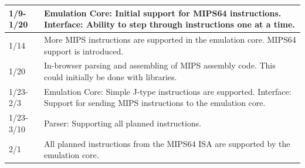 \documentclass[
    paper=letter,
    parskip=half,
    fontsize=12pt,
    titlepage=firstiscover,
    toc=bibliography,
    numbers=endperiod
]{scrartcl}
\begin{document}
{\begin{tabularx}{\textwidth}{|l|X|}
        1/9-1/20      & Emulation Core: Initial support for MIPS64 instructions. \newline Interface: Ability to step through instructions one at a time.                                                                                                                                                                                                                                                                                                     \\\hline
        1/14          & More MIPS instructions are supported in the emulation core. MIPS64 support is introduced.                                                                                                                                                                                                                                                                                                                                            \\\hline
        1/20          & In-browser parsing and assembling of MIPS assembly code. This could initially be done with libraries.                                                                                                                                                                                                                                                                                                                                \\\hline
        1/23-2/3      & Emulation Core: Simple J-type instructions are supported. \newline Interface: Support for sending MIPS instructions to the emulation core.                                                                                                                                                                                                                                                                                           \\\hline
        1/23-3/10     & Parser: Supporting all planned instructions.                                                                                                                                                                                                                                                                                                                                                                                         \\\hline
        2/1           & All planned instructions from the MIPS64 ISA are supported by the emulation core.                                                                                                                                                                                                                                                                                                                                                    \\\hline

\end{tabularx}}
\end{document}
